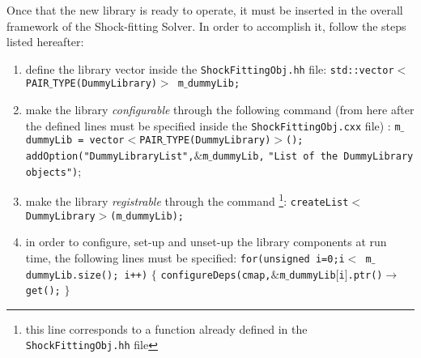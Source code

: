 \documentclass[11pt,a4paper,oneside]{article}
\begin{document}
Once that the new library is ready to operate, it must be inserted in the overall framework of the Shock-fitting Solver. 
\newline
In order to accomplish it, follow the steps listed hereafter:
\begin{enumerate}
\item{define the library vector inside the \texttt{ShockFittingObj.hh} file:
\newline
\newline
\hspace*{1cm} \texttt{std::vector$<$PAIR$\_$TYPE(DummyLibrary)$>$ m$\_${}dummyLib;}
\newline
\newline
}
\item{make the library \textit{configurable} through the following command (from here after the defined lines must be specified inside the \texttt{ShockFittingObj.cxx} file) :
\newline
\newline
\hspace*{1cm} \texttt{m$\_$dummyLib = vector$<$PAIR$\_$TYPE(DummyLibrary)$>$();}
\newline
\hspace*{1cm} \texttt{addOption("DummyLibraryList",$\&$m$\_$dummyLib,}
\newline
\hspace*{3cm} \texttt{"List of the DummyLibrary objects")};
\newline
\newline
}
\item{make the library \textit{registrable} through the command \footnote{this line corresponds to a function already defined in the \texttt{ShockFittingObj.hh} file}:
\newline
\newline
\hspace*{1cm} \texttt{createList$<$DummyLibrary$>$(m$\_$dummyLib);}
}
\item{in order to configure, set-up and unset-up the library components at run time, the following lines must be specified:
\newline
\newline
\hspace*{1cm} \texttt{for(unsigned i=0;i$<$ m$\_$dummyLib.size(); i++)} $\{$
\newline
\hspace*{2cm} \texttt{configureDeps(cmap,$\&$m$\_$dummyLib$[$i$]$.ptr()$\to$get();}
\newline
\hspace*{1cm} $\}$
}
\end{enumerate}
\end{document}
